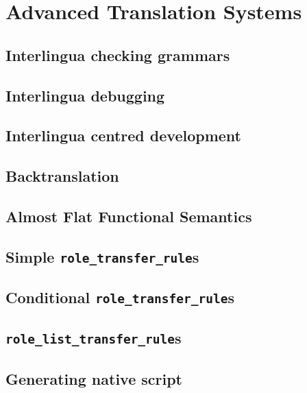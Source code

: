 \chapter{Advanced Translation Systems}
\label{Chapter:AdvancedTranslation}

\author{Manny Rayner}

\section{Interlingua checking grammars}
\label{Section:InterlinguaCheckingGrammar}

\section{Interlingua debugging}
\label{Section:InterlinguaDebugging}

\section{Interlingua centred development}
\label{Section:InterlinguaCentredDevelopment}

\section{Backtranslation}
\label{Section:Backtranslation}

\section{Almost Flat Functional Semantics}
\label{Section:AFF}

\section{Simple {\tt role\_transfer\_rule}s}
\label{Section:RoleTransfer}

\section{Conditional {\tt role\_transfer\_rule}s}
\label{Section:ConditionalRoleTransfer}

\section{{\tt role\_list\_transfer\_rule}s}
\label{Section:RoleListTransfer}

\section{Generating native script}
\label{Section:NativeScript}

